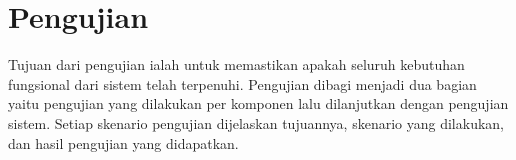 \section{Pengujian}


Tujuan dari pengujian ialah untuk memastikan apakah seluruh kebutuhan fungsional dari sistem telah terpenuhi.
Pengujian dibagi menjadi dua bagian yaitu pengujian yang dilakukan per komponen lalu dilanjutkan dengan pengujian sistem. Setiap skenario pengujian dijelaskan tujuannya, skenario yang dilakukan, dan hasil pengujian yang didapatkan.








